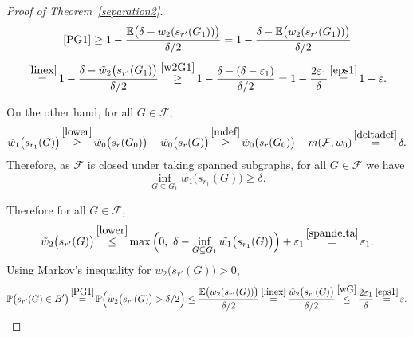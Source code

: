 \documentclass[12pt,a4paper]{article}
\newcommand{\eps}{\varepsilon}
\newcommand{\E}{\mathbb{E}}
\newcommand{\F}{\mathcal{F}}
\renewcommand{\P}{\mathbb{P}}
\renewcommand{\:}{\colon}
\begin{document}
\begin{proof}[Proof of Theorem~\ref{separation2}]
\begin{equation*}
\eqref{PG1} \ge 1 - \frac{\E\big(\delta - w_2(s_{r'}(G_1))\big)}{\delta / 2}
=  1 - \frac{\delta - \E\big(w_2(s_{r'}(G_1))\big)}{\delta / 2}
\end{equation*}
\begin{equation*}
\mathop{=}^{\eqref{linex}} 1 - \frac{\delta - \tilde{w}_2\big(s_{r'}(G_1)\big)}{\delta / 2}
\mathop{\ge}^{\eqref{w2G1}} 1 - \frac{\delta - (\delta -\eps_1)}{\delta / 2}
= 1 - \frac{2 \eps_1}{\delta} \mathop{=}^{\eqref{eps1}} 1 - \eps.
\end{equation*}

On the other hand, for all $G \in \F$,
\begin{equation*}
\tilde{w}_1\big(s_{r_1}(G)\big)
\mathop{\ge}^{\eqref{lower}}
\tilde{w}_0\big(s_r(G_0)\big) - \tilde{w}_0\big(s_r(G)\big)
\mathop{\ge}^{\eqref{mdef}} \tilde{w}_0\big(s_r(G_0)\big) - m(\F, w_0)
\mathop{=}^{\eqref{deltadef}} \delta.
\end{equation*}
Therefore, as $\F$ is closed under taking spanned subgraphs, for all $G \in \F$ we have 
\begin{equation} \label{spandelta}
\inf_{G \subseteq G_1} \tilde{w_1}\big(s_{r_1}(G)\big) \ge \delta.
\end{equation}

Therefore for all $G \in \F$,
\begin{equation} \label{wG}
\tilde{w}_2\big(s_{r'}(G)\big)
\mathop{\le}^{\eqref{lower}}
\max\Big(0,\ \delta - \inf_{G \subseteq G_1} \tilde{w_1}\big(s_{r_1}(G)\big)\Big) + \eps_1 \mathop{=}^{\eqref{spandelta}} \eps_1.
\end{equation}
Using Markov's inequality for $w_2\big(s_{r'}(G)\big) > 0$,
\begin{equation*}
\P\big(s_{r'}(G) \in B'\big)
\mathop{=}^{\eqref{PG1}} \P\Big(w_2\big(s_{r'}(G)\big) > \delta / 2 \Big)
\le \frac{\E\big(w_2(s_{r'}(G))\big)}{\delta / 2}
\mathop{=}^{\eqref{linex}} \frac{\tilde{w}_2\big(s_{r'}(G)\big)}{\delta / 2}
\mathop{\le}^{\eqref{wG}} \frac{2 \eps_1}{\delta} \mathop{=}^{\eqref{eps1}} \eps. \qedhere
\end{equation*}
\end{proof}
\end{document}
